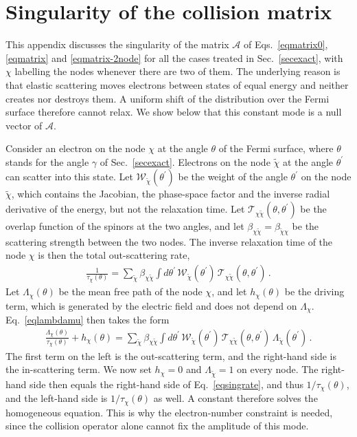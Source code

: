 \documentclass[aps,prb,onecolumn,nofootinbib,citeautoscript,10pt]{revtex4-2}
\begin{document}
\section{\texorpdfstring{Singularity of the collision matrix}{Singularity of the collision matrix}}
\label{appsing}

This appendix discusses the singularity of the matrix $\mathcal A$ of Eqs.~\eqref{eqmatrix0}, \eqref{eqmatrix} and \eqref{eqmatrix-2node} for all the cases treated in Sec.~\ref{secexact}, with $\chi$ labelling the nodes whenever there are two of them. The underlying reason is that elastic scattering moves electrons between states of equal energy and neither creates nor destroys them. A uniform shift of the distribution over the Fermi surface therefore cannot relax. We show below that this constant mode is a null vector of $\mathcal A$.

Consider an electron on the node $\chi$ at the angle $\theta$ of the Fermi surface, where $\theta$ stands for the angle $\gamma$ of Sec.~\ref{secexact}. Electrons on the node $\tilde\chi$ at the angle $\theta^\prime$ can scatter into this state. Let $\mathcal W_{\tilde\chi}(\theta^\prime)$ be the weight of the angle $\theta^\prime$ on the node $\tilde\chi$, which contains the Jacobian, the phase-space factor and the inverse radial derivative of the energy, but not the relaxation time. Let $\mathcal T_{\chi\tilde\chi}(\theta,\theta^\prime)$ be the overlap function of the spinors at the two angles, and let $\beta_{\chi\tilde\chi}=\beta_{\tilde\chi\chi}$ be the scattering strength between the two nodes. The inverse relaxation time of the node $\chi$ is then the total out-scattering rate,
\begin{align}
\frac{1}{\tau_\chi(\theta)}=\sum_{\tilde\chi}\beta_{\chi\tilde\chi}\int d\theta^\prime\,\mathcal W_{\tilde\chi}(\theta^\prime)\,\mathcal T_{\chi\tilde\chi}(\theta,\theta^\prime)\,.
\label{eqsingrate}
\end{align}
Let $\Lambda_\chi(\theta)$ be the mean free path of the node $\chi$, and let $h_\chi(\theta)$ be the driving term, which is generated by the electric field and does not depend on $\Lambda_\chi$. Eq.~\eqref{eqlambdamu} then takes the form
\begin{align}
\frac{\Lambda_\chi(\theta)}{\tau_\chi(\theta)}+h_\chi(\theta)=\sum_{\tilde\chi}\beta_{\chi\tilde\chi}\int d\theta^\prime\,\mathcal W_{\tilde\chi}(\theta^\prime)\,\mathcal T_{\chi\tilde\chi}(\theta,\theta^\prime)\,\Lambda_{\tilde\chi}(\theta^\prime)\,.
\label{eqsingbolt}
\end{align}
The first term on the left is the out-scattering term, and the right-hand side is the in-scattering term. We now set $h_\chi=0$ and $\Lambda_{\tilde\chi}=1$ on every node. The right-hand side then equals the right-hand side of Eq.~\eqref{eqsingrate}, and thus $1/\tau_\chi(\theta)$, and the left-hand side is $1/\tau_\chi(\theta)$ as well. A constant therefore solves the homogeneous equation. This is why the electron-number constraint is needed, since the collision operator alone cannot fix the amplitude of this mode.
\end{document}
